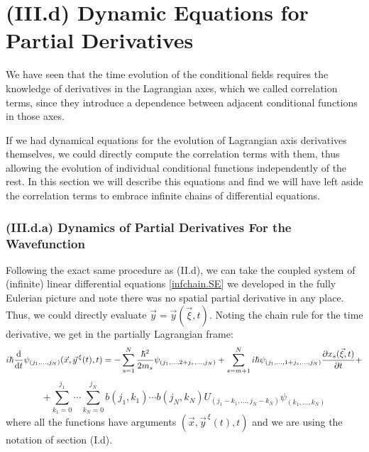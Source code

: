 \documentclass[11pt, a4paper]{article} %
\begin{document}
\section*{(III.d) Dynamic Equations for Partial Derivatives}\vspace{-0.2cm}
We have seen that the time evolution of the conditional fields requires the knowledge of derivatives in the Lagrangian axes, which we called correlation terms, since they introduce a dependence between adjacent conditional functions in those axes.

If we had dynamical equations for the evolution of Lagrangian axis derivatives themselves, we could directly compute the correlation terms with them, thus allowing the evolution of individual conditional functions independently of the rest. In this section we will describe this equations and find we will have left aside the correlation terms to embrace infinite chains of differential equations.

\subsubsection*{(III.d.a) Dynamics of Partial Derivatives For the Wavefunction}\vspace{-0.1cm}
Following the exact same procedure as (II.d), we can take the coupled system of (infinite) linear differential equations \eqref{infchain.SE} we developed in the fully Eulerian picture and note there was no spatial partial derivative in any place. Thus, we could directly evaluate $\vec{y}=\vec{y}(\vec{\xi},t)$. Noting the chain rule for the time derivative, we get in the partially Lagrangian frame:\vspace{-0.1cm}
\begin{equation}\label{infchain.SE.EL}
i\hbar \dv{}{t}\psi_{(j_1,...,j_N)}(\vec{x},\vec{y}^{\, \xi}(t),t)=-\sum_{s=1}^N\frac{\hbar^2}{2m_s}\psi_{(j_1,...,2+j_s,...,j_N)}+\sum_{s=m+1}^N i\hbar \psi_{(j_1,...,1+j_s,...,j_N)} \pdv{x_s(\vec{\xi},t)}{t}+\vspace{-0.1cm}
\end{equation}
$$
+\sum_{k_1=0}^{j_1}\cdots\sum_{k_N=0}^{j_N} b(j_1,k_1)\cdots b(j_N,k_N)U_{(j_1-k_1,...,j_N-k_N)}\psi_{(k_1,...,k_N)}
$$
where all the functions have arguments $(\vec{x},\vec{y}^{\, \xi}(t),t)$ and we are using the notation of section (I.d).
\end{document}
